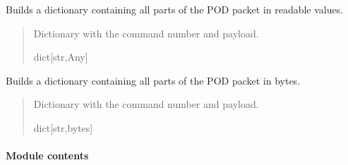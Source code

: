 \documentclass[letterpaper,10pt,english]{sphinxmanual}
\begin{document}
\begin{fulllineitems}
\begin{fulllineitems}
\label{\detokenize{Morelia.Packets:Morelia.Packets.Standard.PacketStandard.TranslateAll}}
\pysigstartsignatures
{}
\pysigstopsignatures
\sphinxAtStartPar
Builds a dictionary containing all parts of the POD packet in readable values.
\begin{quote}\begin{description}
\sphinxAtStartPar
Dictionary with the command number and payload.

\sphinxAtStartPar
dict{[}str,Any{]}

\end{description}\end{quote}

\end{fulllineitems}


\begin{fulllineitems}
\label{\detokenize{Morelia.Packets:Morelia.Packets.Standard.PacketStandard.UnpackAll}}
\pysigstartsignatures
{}
\pysigstopsignatures
\sphinxAtStartPar
Builds a dictionary containing all parts of the POD packet in bytes.
\begin{quote}\begin{description}
\sphinxAtStartPar
Dictionary with the command number and payload.

\sphinxAtStartPar
dict{[}str,bytes{]}

\end{description}\end{quote}

\end{fulllineitems}


\end{fulllineitems}



\paragraph{Module contents}
\label{\detokenize{Morelia.Packets:module-Morelia.Packets}}\label{\detokenize{Morelia.Packets:module-contents}}
\sphinxstepscope
\end{document}
